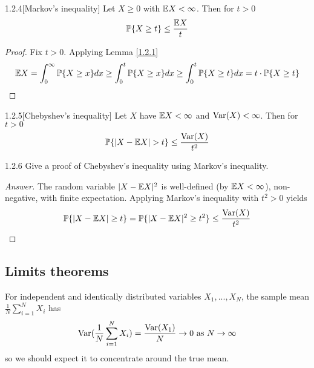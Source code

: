 
\begin{prop}{1.2.4}[Markov's inequality]\label{1.2.4}
Let $X \geq 0$ with $\mathbb{E} X < \infty$. Then for $t > 0$
\begin{align*}
    \mathbb{P} \{ X \geq t\} \leq \frac{\mathbb{E} X} t
\end{align*}
\end{prop}

\begin{proof}
Fix $t>0$. Applying Lemma \ref{1.2.1}
\begin{align*}
    \mathbb{E} X = \int_0^\infty \mathbb{P}\{X \geq x\} dx \geq \int_0^t \mathbb{P}\{X \geq x\} dx \geq \int_0^t \mathbb{P}\{X \geq t\} dx = t\cdot\mathbb{P}\{X \geq t\}
\end{align*}
\end{proof}

\begin{cor}{1.2.5}[Chebyshev's inequality]\label{1.2.5}
Let $X$ have $\mathbb{E} X <\infty$ and $\text{Var}(X) <\infty$. Then for $t > 0$
\begin{align*}
    \mathbb{P} \{ |X -\mathbb{E} X| > t\} \leq \frac{\text{Var}(X)} {t^2}
\end{align*}
\end{cor}

\begin{ex}{1.2.6}\label{1.2.6}
Give a proof of Chebyshev's inequality using Markov's inequality.
\end{ex}
\begin{proof}[Answer]
The random variable $|X - \mathbb{E} X|^2$ is well-defined (by $\mathbb{E} X < \infty$), non-negative, with finite expectation. 
Applying Markov's inequality with $t^2>0$ yields
\begin{align*}
    \mathbb{P} \{|X -\mathbb{E} X| \geq t\} =
    \mathbb{P} \{|X -\mathbb{E} X|^2 \geq t^2\} \leq \frac {\text{Var}(X)}{t^2}
\end{align*}
\end{proof}

\subsection{Limits theorems}

For independent and identically distributed variables $X_1,...,X_N$, the sample mean $\frac1N \sum_{i=1}^N X_i$ has 
\begin{align*}
    \text{Var}(\frac1N\sum_{i=1}^N X_i) = \frac {\text{Var}(X_1)} N \to 0 \text{ as $N\to \infty$}
\end{align*}
so we should expect it to concentrate around the true mean.


